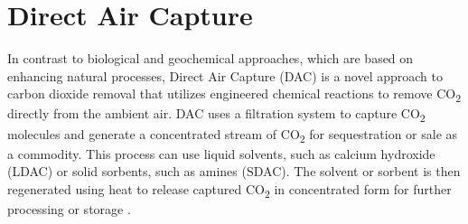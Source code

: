 \section{Direct Air Capture}
In contrast to biological and geochemical approaches, which are based on enhancing natural processes, Direct Air Capture (DAC) is a novel approach to carbon dioxide removal that utilizes engineered chemical reactions to remove CO\textsubscript{2} directly from the ambient air. DAC uses a filtration system to capture CO\textsubscript{2} molecules and generate a concentrated stream of CO\textsubscript{2} for sequestration or sale as a commodity. This process can use liquid solvents, such as calcium hydroxide (LDAC) or solid sorbents, such as amines (SDAC). The solvent or sorbent is then regenerated using heat to release captured CO\textsubscript{2} in concentrated form for further processing or storage \parencite{Gorman2021CarbonHerzog, Mulligan2020CarbonShot:States}.
